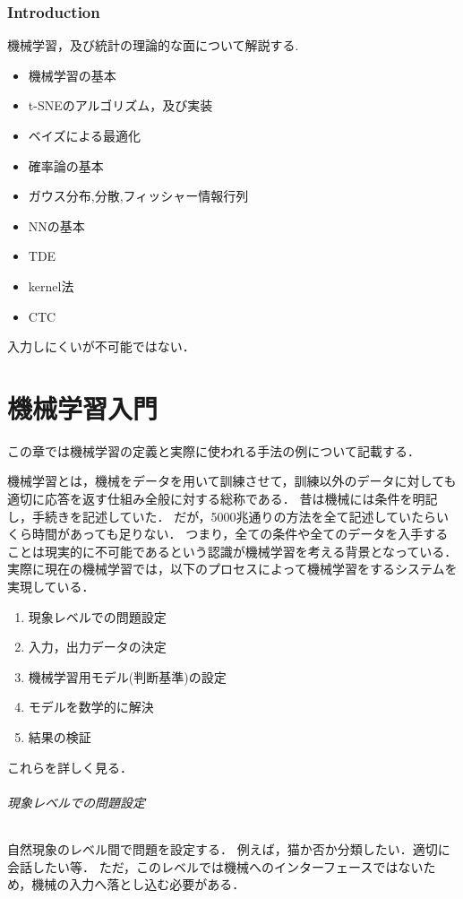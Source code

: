 \documentclass{ujarticle}
\begin{document}
\section{Introduction}
\label{sec:Introduction}
機械学習，及び統計の理論的な面について解説する.

\begin{itemize}
  \item 機械学習の基本
  \item t-SNEのアルゴリズム，及び実装
  \item ベイズによる最適化
  \item 確率論の基本
  \item ガウス分布,分散,フィッシャー情報行列
  \item NNの基本
  \item TDE
  \item kernel法
  \item CTC
\end{itemize}
入力しにくいが不可能ではない．


\part{機械学習入門}
この章では機械学習の定義と実際に使われる手法の例について記載する．

機械学習とは，機械をデータを用いて訓練させて，訓練以外のデータに対しても適切に応答を返す仕組み全般に対する総称である．
昔は機械には条件を明記し，手続きを記述していた．
だが，5000兆通りの方法を全て記述していたらいくら時間があっても足りない．
つまり，全ての条件や全てのデータを入手することは現実的に不可能であるという認識が機械学習を考える背景となっている．
実際に現在の機械学習では，以下のプロセスによって機械学習をするシステムを実現している．
\begin{enumerate}
  \item 現象レベルでの問題設定
  \item 入力，出力データの決定
  \item 機械学習用モデル(判断基準)の設定
  \item モデルを数学的に解決
  \item 結果の検証
\end{enumerate}
これらを詳しく見る．

\paragraph{現象レベルでの問題設定}
自然現象のレベル間で問題を設定する．
例えば，猫か否か分類したい．適切に会話したい等．
ただ，このレベルでは機械へのインターフェースではないため，機械の入力へ落とし込む必要がある．
\end{document}
